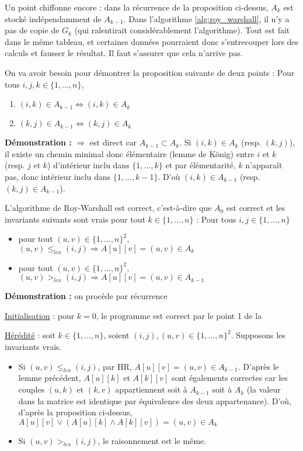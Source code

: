 \documentclass[../../../main.tex]{subfiles}
\begin{document}
Un point chiffonne encore : dans la récurrence de la proposition ci-dessus, $A_k$ est stocké indépendamment de $A_{k-1}$. Dans l'algorithme \ref{alg:roy_warshall}, il n'y a pas de copie de $G_k$ (qui ralentirait considérablement l'algorithme). Tout est fait dans le même tableau, et certaines données pourraient donc s'entrecouper lors des calculs et fausser le résultat. Il faut s'assurer que cela n'arrive pas.

\lemma{} On va avoir besoin pour démontrer la proposition suivante de deux points :\newline
Pour tous $i, j, k\in\{1, \dots, n\}$,
\begin{enumerate}
	\item $(i, k)\in A_{k-1}\Leftrightarrow (i, k)\in A_k$
	\item $(k, j)\in A_{k-1}\Leftrightarrow (k, j)\in A_k$
\end{enumerate}
\textbf{Démonstration :} $\Rightarrow$ est direct car $A_{k-1}\subset A_k$. Si $(i, k)\in A_k$ (resp. $(k, j)$), il existe un chemin minimal donc élémentaire (lemme de König) entre $i$ et $k$ (resp. $j$ et $k$) d'intérieur inclu dans $\{1, \dots, k\}$ et par élémentarité, $k$ n'apparaît pas, donc intérieur inclu dans $\{1, \dots, k-1\}$. D'où $(i, k)\in A_{k-1}$ (resp. $(k, j)\in A_{k-1}$).

 L'algorithme de Roy-Warshall est correct, c'est-à-dire que $A_0$ est correct et les invariants suivants sont vrais pour tout $k\in \{1, \dots, n\}$ :
\newline
Pour tous $i, j\in \{1, \dots, n\}$
\begin{itemize}
	\item pour tout $(u, v)\in \{1, \dots, n\}^2$, $(u, v)\leq_{lex} (i, j) \Rightarrow A[u][v] = (u, v)\in A_k$
	\item pour tout $(u, v)\in \{1, \dots, n\}^2$, $(u, v) >_{lex} (i, j) \Rightarrow A[u][v] = (u, v)\in A_{k-1}$
\end{itemize}
\textbf{Démonstration :} on procède par récurrence

\underline{Initialisation} : pour $k = 0$, le programme est correct par le point 1 de la 

\underline{Hérédité} : soit $k\in\{1, \dots, n\}$, soient $(i, j), (u, v)\in\{1, \dots, n\}^2$. Supposons les invariants vrais.
\begin{itemize}
	\item Si $(u, v)\leq_{lex} (i, j)$, par HR, $A[u][v] = (u, v)\in A_{k-1}$.\newline
	D'après le lemme précédent, $A[u][k]$ et $A[k][v]$ sont égalements correctes car les couples $(u, k)$ et $(k, v)$ appartiennent soit à $A_{k-1}$ soit à $A_k$ (la valeur dans la matrice est identique par équivalence des deux appartenance).\newline
	D'où, d'après la proposition ci-dessus, $A[u][v]\vee (A[u][k] \wedge A[k][v]) = (u, v)\in A_k$
	\item Si $(u, v)>_{lex} (i, j)$, le raisonnement est le même.
\end{itemize}
\end{document}

